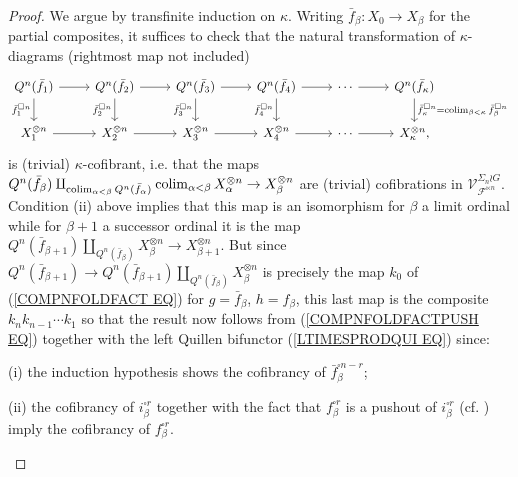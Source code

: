 \documentclass[a4paper,10pt]{article}%
\begin{document}
\begin{proof}
We argue by transfinite induction on $\kappa$.
Writing $\bar{f}_{\beta} \colon X_0 \to X_{\beta}$ for the partial composites, it suffices to check that the natural transformation of $\kappa$-diagrams (rightmost map not included)
\[
\begin{tikzcd}
		Q^n(\bar{f}_{1}) \ar{d}[swap]{\bar{f}_1^{\square n}} \ar{r}
	&
		Q^n(\bar{f}_{2}) \ar{d}[swap]{\bar{f}_2^{\square n}} \ar{r}
	&
		Q^n(\bar{f}_{3}) \ar{d}[swap]{\bar{f}_3^{\square n}} \ar{r}
	&
		Q^n(\bar{f}_{4}) \ar{d}[swap]{\bar{f}_4^{\square n}} \ar{r}
	&
		\cdots \ar{r}
	&
		Q^n(\bar{f}_{\kappa}) \ar{d}{\bar{f}_{\kappa}^{\square n}
		=\colim_{\beta < \kappa} \bar{f}_{\beta}^{\square n}}
\\
		X_1^{\otimes n} \ar{r}
	&
		X_2^{\otimes n} \ar{r}
	&
		X_3^{\otimes n} \ar{r}
	&
		X_4^{\otimes n} \ar{r}
	&
		\cdots \ar{r}
	&
		X_{\kappa}^{\otimes n},
\end{tikzcd}
\]
is (trivial) $\kappa$-cofibrant, i.e. that the maps 
$Q^n(\bar{f}_{\beta})
\amalg_{\operatorname{colim}_{\alpha < \beta} Q^n(\bar{f}_{\alpha}) }
\operatorname{colim}_{\alpha < \beta} X_{\alpha}^{\otimes n} 
	\to
X_{\beta}^{\otimes n} 
$ are (trivial) cofibrations in 
$\mathcal{V}^{\Sigma_n \wr G}_{\mathcal{F}^{\ltimes n}}$.
Condition (ii) above implies that this map is an isomorphism for $\beta$ a limit ordinal 
while for $\beta+1$ a successor ordinal it is the map
$Q^n(\bar{f}_{\beta+1})
\amalg_{Q^n(\bar{f}_{\beta}) }
X_{\beta}^{\otimes n} 
	\to
X_{\beta+1}^{\otimes n}$.
But since 
$Q^n(\bar{f}_{\beta+1}) \to Q^n(\bar{f}_{\beta+1})
\amalg_{Q^n(\bar{f}_{\beta}) }
X_{\beta}^{\otimes n}$ 
is precisely the map $k_0$ of (\ref{COMPNFOLDFACT EQ}) for 
$g=\bar{f}_{\beta}$, $h=f_{\beta}$, this last map is the composite $k_nk_{n-1}\cdots k_1$ so that the result now follows from (\ref{COMPNFOLDFACTPUSH EQ}) 
together with the left Quillen bifunctor
(\ref{LTIMESPRODQUI EQ})
since:
\begin{inparaenum}
\item[(i)] the induction hypothesis shows the cofibrancy of  $\bar{f}_{\beta}^{\square n-r}$;
\item[(ii)] the cofibrancy of $i_{\beta}^{\square r}$
together with the fact that 
$f_{\beta}^{\square r}$ is a pushout of $i_{\beta}^{\square r}$
(cf. \cite[Lemma 4.11]{Pe16})
 imply the cofibrancy of $f_{\beta}^{\square r}$.
\end{inparaenum}
\end{proof}
\end{document}
